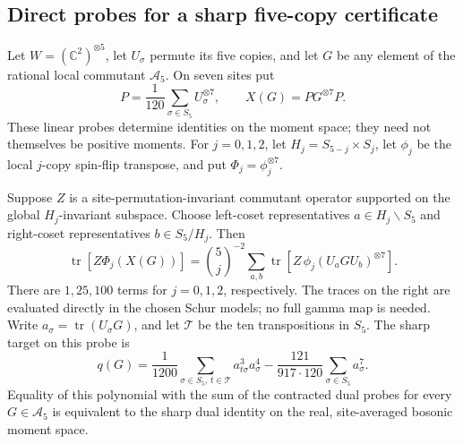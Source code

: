\subsection{Direct probes for a sharp five-copy certificate}
\label{sec:fivecopy-direct-probes}

Let $W=(\mathbb C^2)^{\otimes5}$, let $U_\sigma$ permute its five
copies, and let $G$ be any element of the rational local commutant
$\mathcal A_5$. On seven sites put
\[
 P=\frac1{120}\sum_{\sigma\in S_5}U_\sigma^{\otimes7},\qquad
 X(G)=PG^{\otimes7}P.
\]
These linear probes determine identities on the moment space; they need not themselves be positive moments. For $j=0,1,2$, let
$H_j=S_{5-j}\times S_j$, let $\phi_j$ be the local $j$-copy spin-flip transpose,
and put $\Phi_j=\phi_j^{\otimes7}$.

\begin{lemma}
\label{lem:fivecopy-direct-probes}
Suppose $Z$ is a site-permutation-invariant commutant operator supported
on the global $H_j$-invariant subspace. Choose left-coset representatives
$a\in H_j\backslash S_5$ and right-coset representatives
$b\in S_5/H_j$. Then
\[
 \operatorname{tr}[Z\Phi_j(X(G))]
 =\binom5j^{-2}\sum_{a,b}
       \operatorname{tr}\left[Z\,\phi_j(U_aGU_b)^{\otimes7}\right].
\]
There are $1,25,100$ terms for $j=0,1,2$, respectively.
The traces on the right are evaluated directly in the chosen Schur models;
no full gamma map is needed. Write
$a_\sigma=\operatorname{tr}(U_\sigma G)$, and let $\mathcal T$ be the
ten transpositions in $S_5$. The sharp target on this probe is
\[
 q(G)=\frac1{1200}\sum_{\sigma\in S_5,\,t\in\mathcal T}
       a_{t\sigma}^3a_\sigma^4
       -\frac{121}{917\cdot120}\sum_{\sigma\in S_5}a_\sigma^7.
\]
Equality of this polynomial with the sum of the contracted dual probes
for every $G\in\mathcal A_5$ is equivalent to the sharp dual identity
on the real, site-averaged bosonic moment space.
\end{lemma}
